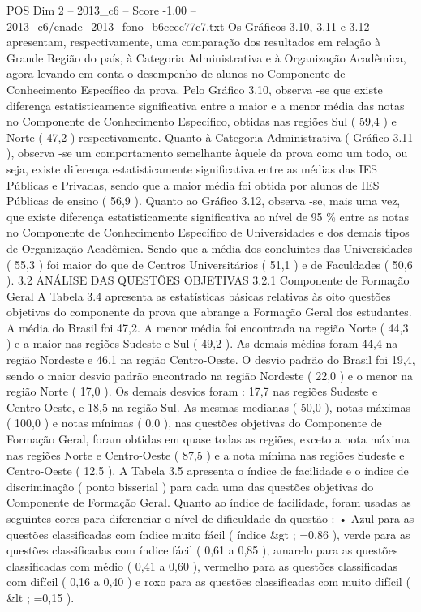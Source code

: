 \begin{textsample}{POS Dim 2 – 2013\_c6 – Score -1.00 – 2013\_c6/enade\_2013\_fono\_b6ccec77c7.txt}
Os Gráficos 3.10, 3.11 e 3.12 apresentam, respectivamente, uma comparação dos resultados em relação à Grande Região do país, à Categoria Administrativa e à Organização Acadêmica, agora levando em conta o desempenho de alunos no Componente de Conhecimento Específico da prova.
Pelo Gráfico 3.10, observa -se que existe diferença estatisticamente significativa entre a maior e a menor média das notas no Componente de Conhecimento Específico, obtidas nas regiões Sul ( 59,4 ) e Norte ( 47,2 ) respectivamente.
Quanto à Categoria Administrativa ( Gráfico 3.11 ), observa -se um comportamento semelhante àquele da prova como um todo, ou seja, existe diferença estatisticamente significativa entre as médias das IES Públicas e Privadas, sendo que a maior média foi obtida por alunos de IES Públicas de ensino ( 56,9 ).
Quanto ao Gráfico 3.12, observa -se, mais uma vez, que existe diferença estatisticamente significativa ao nível de 95 \% entre as notas no Componente de Conhecimento Específico de Universidades e dos demais tipos de Organização Acadêmica.
Sendo que a média dos concluintes das Universidades ( 55,3 ) foi maior do que de Centros Universitários ( 51,1 ) e de Faculdades ( 50,6 ). 3.2 ANÁLISE DAS QUESTÕES OBJETIVAS 3.2.1 Componente de Formação Geral A Tabela 3.4 apresenta as estatísticas básicas relativas às oito questões objetivas do componente da prova que abrange a Formação Geral dos estudantes.
A média do Brasil foi 47,2.
A menor média foi encontrada na região Norte ( 44,3 ) e a maior nas regiões Sudeste e Sul ( 49,2 ).
As demais médias foram 44,4 na região Nordeste e 46,1 na região Centro-Oeste.
O desvio padrão do Brasil foi 19,4, sendo o maior desvio padrão encontrado na região Nordeste ( 22,0 ) e o menor na região Norte ( 17,0 ).
Os demais desvios foram : 17,7 nas regiões Sudeste e Centro-Oeste, e 18,5 na região Sul.
As mesmas medianas ( 50,0 ), notas máximas ( 100,0 ) e notas mínimas ( 0,0 ), nas questões objetivas do Componente de Formação Geral, foram obtidas em quase todas as regiões, exceto a nota máxima nas regiões Norte e Centro-Oeste ( 87,5 ) e a nota mínima nas regiões Sudeste e Centro-Oeste ( 12,5 ).
A Tabela 3.5 apresenta o índice de facilidade e o índice de discriminação ( ponto bisserial ) para cada uma das questões objetivas do Componente de Formação Geral.
Quanto ao índice de facilidade, foram usadas as seguintes cores para diferenciar o nível de dificuldade da questão : • Azul para as questões classificadas com índice muito fácil ( índice \&gt ; =0,86 ), verde para as questões classificadas com índice fácil ( 0,61 a 0,85 ), amarelo para as questões classificadas com médio ( 0,41 a 0,60 ), vermelho para as questões classificadas com difícil ( 0,16 a 0,40 ) e roxo para as questões classificadas com muito difícil ( \&lt ; =0,15 ).

\end{textsample}
